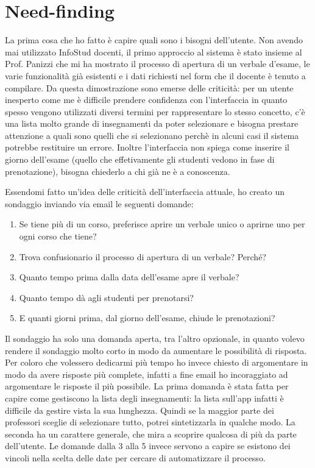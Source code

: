 \documentclass[Lau, oneside, noexaminfo]{sapthesis}%
\begin{document}
\section{Need-finding}
\label{sec:nf}
La prima cosa che ho fatto è capire quali sono i bisogni dell'utente. Non avendo mai utilizzato InfoStud docenti, il primo approccio al sistema è stato insieme al Prof. Panizzi che mi ha mostrato il processo di apertura di un verbale d'esame, le varie funzionalità già esistenti e i dati richiesti nel form che il docente è tenuto a compilare. Da questa dimostrazione sono emerse delle criticità: per un utente inesperto come me è difficile prendere confidenza con l'interfaccia in quanto spesso vengono utilizzati diversi termini per rappresentare lo stesso concetto, c'è una lista molto grande di insegnamenti da poter selezionare e bisogna prestare attenzione a quali sono quelli che si selezionano perchè in alcuni casi il sistema potrebbe restituire un errore. Inoltre l'interfaccia non spiega come inserire il giorno dell'esame (quello che effetivamente gli studenti vedono in fase di prenotazione), bisogna chiederlo a chi già ne è a conoscenza.

Essendomi fatto un'idea delle criticità dell'interfaccia attuale, ho creato un sondaggio inviando via email le seguenti domande:

\begin{enumerate}
	\item Se tiene più di un corso, preferisce aprire un verbale unico o aprirne uno per ogni corso che tiene? 
	\item Trova confusionario il processo di apertura di un verbale? Perché?
	\item Quanto tempo prima dalla data dell'esame apre il verbale?
	\item Quanto tempo dà agli studenti per prenotarsi?
	\item E quanti giorni prima, dal giorno dell'esame, chiude le prenotazioni? 
\end{enumerate}

Il sondaggio ha solo una domanda aperta, tra l'altro opzionale, in quanto volevo rendere il sondaggio molto corto in modo da aumentare 
le possibilità di risposta. Per coloro che volessero dedicarmi più tempo ho invece chiesto di argomentare in modo da avere risposte
più complete, infatti a fine email ho incoraggiato ad argomentare le risposte il più possibile.
La prima domanda è stata fatta per capire come gestiscono la lista degli insegnamenti: la lista sull'app infatti è difficile da gestire vista la sua lunghezza. Quindi se la maggior parte dei professori sceglie di selezionare tutto, potrei sintetizzarla in qualche modo.
La seconda ha un carattere generale, che mira a scoprire qualcosa di più da parte dell'utente.
Le domande dalla 3 alla 5 invece servono a capire se esistono dei vincoli nella scelta delle date per cercare di automatizzare il processo.
\end{document}
